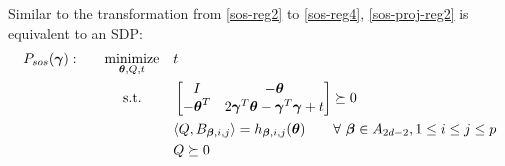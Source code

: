 \documentclass[11pt]{article}
\begin{document}
Similar to the transformation from \eqref{sos-reg2} to \eqref{sos-reg4}, \eqref{sos-proj-reg2} is equivalent to an SDP:
\begin{equation} \label{sos-proj-reg3}
\begin{aligned}
 P_{sos}({\boldsymbol\gamma}): \qquad & \underset{{\boldsymbol\theta}, Q, t}{\text{minimize} }
& & t \\
& \text{\quad\ s.t.}
& & \begin{bmatrix} I & -{\boldsymbol\theta} \\ -{\boldsymbol\theta}^T & 2{\boldsymbol\gamma}^T{\boldsymbol\theta} - {\boldsymbol\gamma}^T{\boldsymbol\gamma} + t \end{bmatrix} \succeq 0 \\
& & & \langle{Q, B_{{\boldsymbol\beta}, i, j}} \rangle = h_{{\boldsymbol\beta}, i, j}({\boldsymbol\theta}) \qquad \forall\ {\boldsymbol\beta} \in A_{2d - 2}, 1 \le i \le j \le p \\
& & & Q \succeq 0 
\end{aligned}
\end{equation}









%
%
\end{document}
